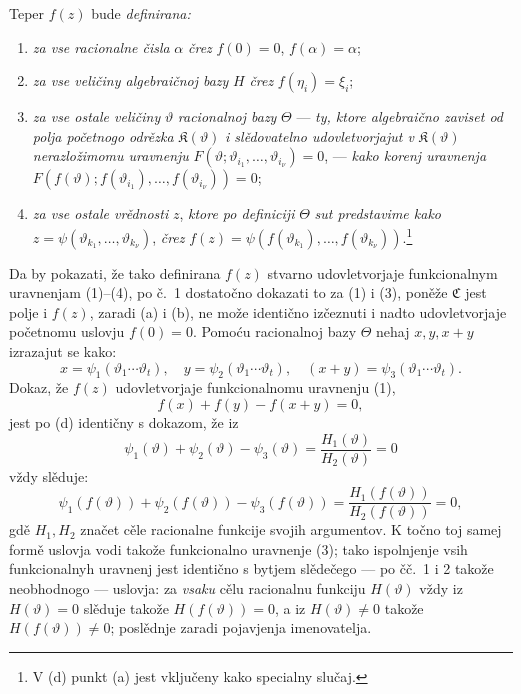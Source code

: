 \documentclass[11pt]{article}
\providecommand{\Cfield}{\mathfrak C}
\providecommand{\Kfield}{\mathfrak K}
\begin{document}
Teper \(f(z)\) bude {\itshape definirana:}
\begin{enumerate}
\item[(a)] {\itshape za vse racionalne čisla} \(\alpha\) {\itshape črez} \(f(0)=0\), \(f(\alpha)=\alpha\);
\item[(b)] {\itshape za vse veličiny algebraičnoj bazy} \(H\) {\itshape črez} \(f(\eta_i)=\xi_i\);
\item[(c)] {\itshape za vse ostale veličiny} \(\vartheta\) {\itshape racionalnoj bazy} \(\Theta\) --- {\itshape ty, ktore algebraično zaviset od polja početnogo odrězka} \(\Kfield(\vartheta)\) {\itshape i slědovatelno udovletvorjajut v} \(\Kfield(\vartheta)\) {\itshape nerazložimomu uravnenju} \(F(\vartheta;\vartheta_{i_1},\ldots,\vartheta_{i_\nu})=0\), --- {\itshape kako korenj uravnenja} \(F(f(\vartheta);f(\vartheta_{i_1}),\ldots,f(\vartheta_{i_\nu}))=0\);
\item[(d)] {\itshape za vse ostale vrědnosti} \(z\), {\itshape ktore po definiciji} \(\Theta\) {\itshape sut predstavime kako} \(z=\psi(\vartheta_{k_1},\ldots,\vartheta_{k_\nu})\), {\itshape črez} \(f(z)=\psi(f(\vartheta_{k_1}),\ldots,f(\vartheta_{k_\nu}))\).\footnote{V (d) punkt (a) jest vključeny kako specialny slučaj.}
\end{enumerate}
Da by pokazati, že tako definirana \(f(z)\) stvarno udovletvorjaje funkcionalnym uravnenjam (1)--(4), po č.~1 dostatočno dokazati to za (1) i (3), poněže \(\Cfield\) jest polje i \(f(z)\), zaradi (a) i (b), ne može identično izčeznuti i nadto udovletvorjaje početnomu uslovju \(f(0)=0\). Pomoću racionalnoj bazy \(\Theta\) nehaj \(x,y,x+y\) izrazajut se kako:
\[
x=\psi_1(\vartheta_1\cdots\vartheta_t),\quad
 y=\psi_2(\vartheta_1\cdots\vartheta_t),\quad
 (x+y)=\psi_3(\vartheta_1\cdots\vartheta_t).
\]
Dokaz, že \(f(z)\) udovletvorjaje funkcionalnomu uravnenju (1),
\[
f(x)+f(y)-f(x+y)=0,
\]
jest po (d) identičny s dokazom, že iz
\[
\psi_1(\vartheta)+\psi_2(\vartheta)-\psi_3(\vartheta)
 =\frac{H_1(\vartheta)}{H_2(\vartheta)}=0
\]
vždy slěduje:
\[
\psi_1(f(\vartheta))+\psi_2(f(\vartheta))-\psi_3(f(\vartheta))
 =\frac{H_1(f(\vartheta))}{H_2(f(\vartheta))}=0,
\]
gdě \(H_1,H_2\) značet cěle racionalne funkcije svojih argumentov. K točno toj samej formě uslovja vodi takože funkcionalno uravnenje (3); tako ispolnjenje vsih funkcionalnyh uravnenj jest identično s bytjem slědečego --- po čč.~1 i 2 takože neobhodnogo --- uslovja: za {\itshape vsaku} cělu racionalnu funkciju \(H(\vartheta)\) vždy iz \(H(\vartheta)=0\) slěduje takože \(H(f(\vartheta))=0\), a iz \(H(\vartheta)\ne0\) takože \(H(f(\vartheta))\ne0\); poslědnje zaradi pojavjenja imenovatelja.
\end{document}
